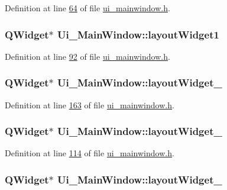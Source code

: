 Definition at line \hyperlink{a00139_source_l00064}{64} of file \hyperlink{a00139_source}{ui\+\_\+mainwindow.\+h}.

\hypertarget{a00080_aab31b3dec8d767525dea6f163e029e48}{
\subsubsection[{layout\+Widget1}]{\setlength{\rightskip}{0pt plus 5cm}Q\+Widget$\ast$ Ui\+\_\+\+Main\+Window\+::layout\+Widget1}}\label{a00080_aab31b3dec8d767525dea6f163e029e48}


Definition at line \hyperlink{a00139_source_l00092}{92} of file \hyperlink{a00139_source}{ui\+\_\+mainwindow.\+h}.

\hypertarget{a00080_a873441ec9cec68e0d4eacee271765553}{
\subsubsection[{layout\+Widget\+\_\+2}]{\setlength{\rightskip}{0pt plus 5cm}Q\+Widget$\ast$ Ui\+\_\+\+Main\+Window\+::layout\+Widget\+\_}}\label{a00080_a873441ec9cec68e0d4eacee271765553}


Definition at line \hyperlink{a00139_source_l00163}{163} of file \hyperlink{a00139_source}{ui\+\_\+mainwindow.\+h}.

\hypertarget{a00080_a185129091df0a390d82417f2f52cb80f}{
\subsubsection[{layout\+Widget\+\_\+3}]{\setlength{\rightskip}{0pt plus 5cm}Q\+Widget$\ast$ Ui\+\_\+\+Main\+Window\+::layout\+Widget\+\_}}\label{a00080_a185129091df0a390d82417f2f52cb80f}


Definition at line \hyperlink{a00139_source_l00114}{114} of file \hyperlink{a00139_source}{ui\+\_\+mainwindow.\+h}.

\hypertarget{a00080_ac4725768128006ab5bea6e58b67959d0}{
\subsubsection[{layout\+Widget\+\_\+4}]{\setlength{\rightskip}{0pt plus 5cm}Q\+Widget$\ast$ Ui\+\_\+\+Main\+Window\+::layout\+Widget\+\_}}\label{a00080_ac4725768128006ab5bea6e58b67959d0}


